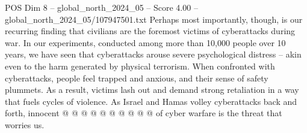 \begin{textsample}{POS Dim 8 – global\_north\_2024\_05 – Score 4.00 – global\_north\_2024\_05/107947501.txt}
Perhaps most importantly, though, is our recurring finding that civilians are the foremost victims of cyberattacks during war.
In our experiments, conducted among more than 10,000 people over 10 years, we have seen that cyberattacks arouse severe psychological distress -- akin even to the harm generated by physical terrorism.
When confronted with cyberattacks, people feel trapped and anxious, and their sense of safety plummets.
As a result, victims lash out and demand strong retaliation in a way that fuels cycles of violence.
As Israel and Hamas volley cyberattacks back and forth, innocent @ @ @ @ @ @ @ @ @ @ of cyber warfare is the threat that worries us.

\end{textsample}
